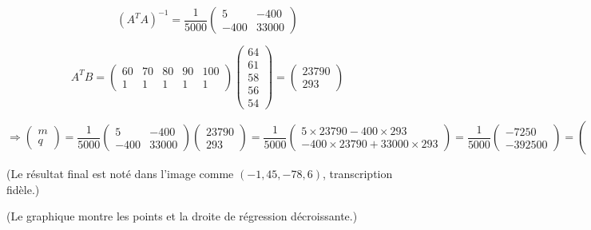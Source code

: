 \documentclass{article}
\begin{document}
\[
(A^T A)^{-1} = \frac{1}{5000} \begin{pmatrix}
5 & -400 \\
-400 & 33000
\end{pmatrix}
\]

\[
A^T B = \begin{pmatrix}
60 & 70 & 80 & 90 & 100 \\
1 & 1 & 1 & 1 & 1
\end{pmatrix}
\begin{pmatrix}
64 \\
61 \\
58 \\
56 \\
54
\end{pmatrix}
= \begin{pmatrix}
23790 \\
293
\end{pmatrix}
\]

\[
\Rightarrow
\begin{pmatrix} m \\ q \end{pmatrix}
= \frac{1}{5000} \begin{pmatrix}
5 & -400 \\
-400 & 33000
\end{pmatrix}
\begin{pmatrix}
23790 \\
293
\end{pmatrix}
= \frac{1}{5000} \begin{pmatrix}
5 \times 23790 - 400 \times 293 \\
-400 \times 23790 + 33000 \times 293
\end{pmatrix}
= \frac{1}{5000} \begin{pmatrix}
-7250 \\
-392500
\end{pmatrix}
= \begin{pmatrix}
-1,45 \\
-78,5
\end{pmatrix}
\]

\vspace{0.5cm}

\noindent (Le résultat final est noté dans l'image comme $(-1,45, -78,6)$, transcription fidèle.)

\vspace{0.5cm}

\noindent (Le graphique montre les points et la droite de régression décroissante.)
\end{document}
